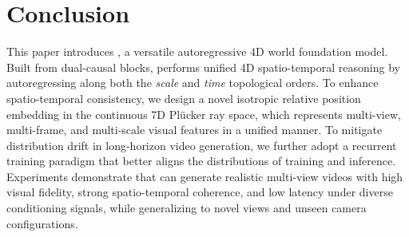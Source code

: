 \section{Conclusion}

This paper introduces \ourmethod{}, a versatile autoregressive 4D world foundation model. Built from dual-causal blocks, \ourmethod{} performs unified 4D spatio-temporal reasoning by autoregressing along both the \textit{scale} and \textit{time} topological orders. To enhance spatio-temporal consistency, we design a novel isotropic relative position embedding in the continuous 7D Pl\"ucker ray space, which represents multi-view, multi-frame, and multi-scale visual features in a unified manner. To mitigate distribution drift in long-horizon video generation, we further adopt a recurrent training paradigm that better aligns the distributions of training and inference. Experiments demonstrate that \ourmethod{} can generate realistic multi-view videos with high visual fidelity, strong spatio-temporal coherence, and low latency under diverse conditioning signals, while generalizing to novel views and unseen camera configurations.
